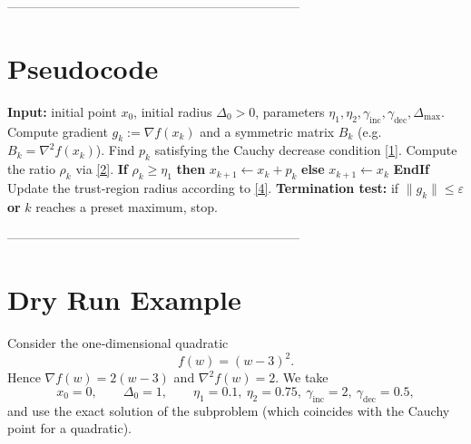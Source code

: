 \documentclass{article}
\begin{document}
---------------------------------------------------------------------

\section*{Pseudocode}
\begin{algorithm}[H]
\caption{Trust‑Region Method with Approximate Subproblem Solution (TR‑AS)}
\begin{algorithmic}[1]
\STATE \textbf{Input:} initial point \(x_{0}\), initial radius \(\Delta_{0}>0\),
parameters \(\eta_{1},\eta_{2},\gamma_{\mathrm{inc}},\gamma_{\mathrm{dec}},\Delta_{\max}\).
    \STATE Compute gradient \(g_{k}:=\nabla f(x_{k})\) and a symmetric matrix
    \(B_{k}\) (e.g. \(B_{k}=\nabla^{2}f(x_{k})\)).
    \STATE Find \(p_{k}\) satisfying the Cauchy decrease condition \eqref{1}.
    \STATE Compute the ratio \(\rho_{k}\) via \eqref{2}.
    \STATE \textbf{If} \(\rho_{k}\ge \eta_{1}\) \textbf{then}
        \STATE\quad\(x_{k+1}\gets x_{k}+p_{k}\) 
    \STATE \textbf{else}
        \STATE\quad\(x_{k+1}\gets x_{k}\) 
    \STATE \textbf{EndIf}
    \STATE Update the trust‑region radius according to \eqref{4}.
    \STATE \textbf{Termination test:}
    if \(\|g_{k}\|\le \varepsilon\) \textbf{or} \(k\) reaches a preset maximum,
    stop.
\ENDFOR
\end{algorithmic}
\end{algorithm}

---------------------------------------------------------------------

\section*{Dry Run Example}
Consider the one‑dimensional quadratic
\[
f(w)=(w-3)^{2}.
\]
Hence \(\nabla f(w)=2(w-3)\) and \(\nabla^{2}f(w)=2\).
We take
\[
x_{0}=0,\qquad \Delta_{0}=1,\qquad
\eta_{1}=0.1,\ \eta_{2}=0.75,\ 
\gamma_{\mathrm{inc}}=2,\ \gamma_{\mathrm{dec}}=0.5,
\]
and use the exact solution of the subproblem (which coincides with the
Cauchy point for a quadratic).
\end{document}
